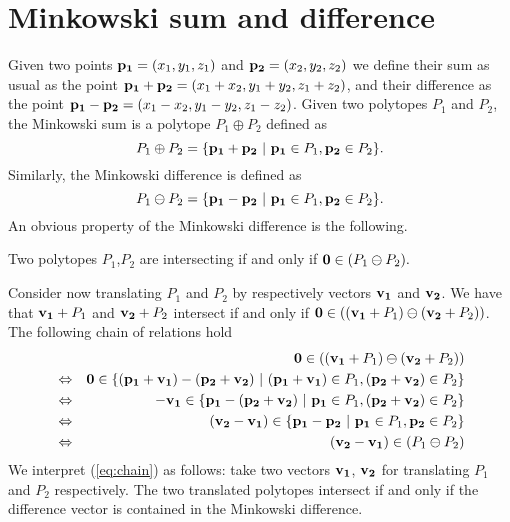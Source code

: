 \section{Minkowski sum and difference}

Given two points $\mathbf{p_1} = (x_1, y_1, z_1)$ and $\mathbf{p_2} = (x_2, y_2, z_2)$ we define
their sum as usual as the point 
$\mathbf{p_1} + \mathbf{p_2} = (x_1+x_2, y_1+y_2, z_1+z_2)$,
and their difference as the point
$\mathbf{p_1} - \mathbf{p_2} = (x_1-x_2, y_1-y_2, z_1-z_2)$.
Given two polytopes $P_1$ and $P_2$, the Minkowski sum is a polytope $P_1 \oplus P_2$
defined as
$$
P_1 \oplus  P_2 = \{ \mathbf{p_1} + \mathbf{p_2} \ \vert\ \mathbf{p_1} \in P_1, \mathbf{p_2} \in P_2 \}.
$$
Similarly, the Minkowski difference is defined as
$$
P_1 \ominus P_2 = \{ \point{p_1} - \point{p_2} \ \vert\ \point{p_1} \in P_1, \point{p_2} \in P_2 \}.
$$
An obvious property of the Minkowski difference is the following. 
\begin{property}
\label{pro:mink}
Two polytopes $P_1$,$P_2$ 
are intersecting if and only if 
$\mathbf{0} \in (P_1 \ominus P_2).$
\end{property}

Consider now translating $P_1$ and $P_2$ by
respectively vectors $\mathbf{v_1}$ and $\mathbf{v_2}$. 
We have that $\mathbf{v_1}+P_1$ and $\mathbf{v_2}+P_2$
intersect if and only if 
$\mathbf{0} \in ((\mathbf{v_1}+P_1) \ominus (\mathbf{v_2}+P_2))$.
The following chain of relations hold
\begin{eqnarray}
\nonumber
& & \mathbf{0} \in ((\mathbf{v_1}+P_1) \ominus (\mathbf{v_2}+P_2)) \\
\nonumber
& \Leftrightarrow & \mathbf{0} \in \{ (\mathbf{p_1}+\mathbf{v_1}) - (\mathbf{p_2}+\mathbf{v_2}) \ \vert\ (\mathbf{p_1} + \mathbf{v_1}) \in P_1, (\mathbf{p_2} + \mathbf{v_2}) \in P_2 \} \\
\nonumber
& \Leftrightarrow & -\mathbf{v_1} \in \{ \mathbf{p_1} - (\mathbf{p_2}+\mathbf{v_2}) \ \vert\ \mathbf{p_1} \in P_1, (\mathbf{p_2} + \mathbf{v_2}) \in P_2 \} \\
\nonumber
& \Leftrightarrow & (\mathbf{v_2} - \mathbf{v_1}) \in \{ \mathbf{p_1} - \mathbf{p_2} \ \vert\ \mathbf{p_1} \in P_1, \mathbf{p_2} \in P_2 \} \\
\label{eq:chain}
& \Leftrightarrow & (\mathbf{v_2} - \mathbf{v_1}) \in (P_1 \ominus P_2)
\end{eqnarray}
We interpret (\ref{eq:chain}) as follows: take two vectors 
$\mathbf{v_1}$, $\mathbf{v_2}$ for translating
$P_1$ and $P_2$ respectively. The two translated polytopes 
intersect if and only if the difference
vector is contained in the Minkowski difference.

